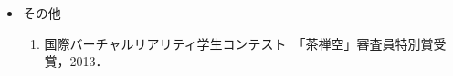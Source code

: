 \begin{itemize}
  \item[] その他
  \begin{enumerate}
    \item 国際バーチャルリアリティ学生コンテスト　「茶禅空」審査員特別賞受賞，2013．
  \end{enumerate}

\end{itemize}
